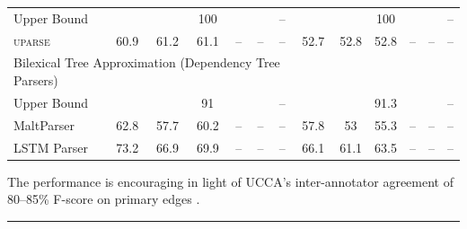 \documentclass[a0,portrait]{a0poster}
\begin{document}
\begin{multicols}{2}
\begin{center}
\begin{tabular}{l|ccc|ccc||ccc|ccc}
		\small Upper Bound
		& & & \small 100 & & & \small --
		& & & \small 100 & & & \small -- \\
		\textsc{uparse} \cite{maier-lichte:2016:DiscoNLP}
		& 60.9 & 61.2 & 61.1 & -- & -- & --
		& 52.7 & 52.8 & 52.8 & -- & -- & -- \\
		\hline
		\multicolumn{8}{l}{\rule{0pt}{2ex} \footnotesize
		Bilexical Tree Approximation (Dependency Tree Parsers)} \\
		\small Upper Bound
		& & & \small 91 & & & \small --
		& & & \small 91.3 & & & \small -- \\
		MaltParser \cite{nivre2007maltparser}
		& 62.8 & 57.7 & 60.2 & -- & -- & --
		& 57.8 & 53 & 55.3 & -- & -- & -- \\
		LSTM Parser \cite{dyer2015transition}
		& 73.2 & 66.9 & 69.9 & -- & -- & --
		& 66.1 & 61.1 & 63.5 & -- & -- & --
	\end{tabular}
\end{center}

The performance is encouraging in light of UCCA's inter-annotator agreement of 80--85\%
F-score on primary edges \cite{abend2013universal}.


\rule{\columnwidth}{1pt}



\end{multicols}
\end{document}
